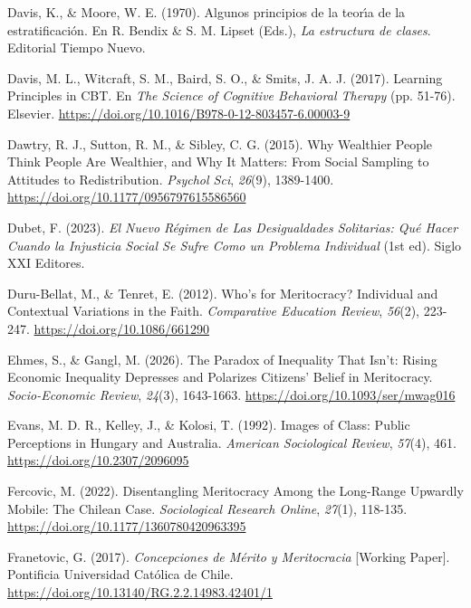 \documentclass[
  spanish,
  a4paper,
  oneside]{scrbook}
\newlength{\cslhangindent}
\newenvironment{CSLReferences}[2] %
 {\begin{list}{}{%
  \setlength{\itemindent}{0pt}
  \setlength{\leftmargin}{0pt}
  \setlength{\parsep}{0pt}
  \ifodd #1
   \setlength{\leftmargin}{\cslhangindent}
   \setlength{\itemindent}{-1\cslhangindent}
  \fi
  \setlength{\itemsep}{#2\baselineskip}}}
 {\end{list}}
\begin{document}
\begin{CSLReferences}{1}{0}
Davis, K., \& Moore, W. E. (1970). {Algunos principios de la teor{ı́}a de
la estratificación}. En R. Bendix \& S. M. Lipset (Eds.), \emph{{La
estructura de clases}}. Editorial Tiempo Nuevo.

Davis, M. L., Witcraft, S. M., Baird, S. O., \& Smits, J. A. J. (2017).
Learning {Principles} in {CBT}. En \emph{The {Science} of {Cognitive
Behavioral Therapy}} (pp. 51-76). Elsevier.
\url{https://doi.org/10.1016/B978-0-12-803457-6.00003-9}

Dawtry, R. J., Sutton, R. M., \& Sibley, C. G. (2015). Why {Wealthier
People Think People Are Wealthier}, and {Why It Matters}: {From Social
Sampling} to {Attitudes} to {Redistribution}. \emph{Psychol Sci},
\emph{26}(9), 1389-1400. \url{https://doi.org/10.1177/0956797615586560}

Dubet, F. (2023). \emph{{El Nuevo Régimen de Las Desigualdades
Solitarias: Qué Hacer Cuando la Injusticia Social Se Sufre Como un
Problema Individual}} (1st ed). Siglo XXI Editores.

Duru-Bellat, M., \& Tenret, E. (2012). Who's for {Meritocracy}?
{Individual} and {Contextual Variations} in the {Faith}.
\emph{Comparative Education Review}, \emph{56}(2), 223-247.
\url{https://doi.org/10.1086/661290}

Ehmes, S., \& Gangl, M. (2026). The Paradox of Inequality That Isn't:
Rising Economic Inequality Depresses and Polarizes Citizens' Belief in
Meritocracy. \emph{Socio-Economic Review}, \emph{24}(3), 1643-1663.
\url{https://doi.org/10.1093/ser/mwag016}

Evans, M. D. R., Kelley, J., \& Kolosi, T. (1992). Images of {Class}:
{Public Perceptions} in {Hungary} and {Australia}. \emph{American
Sociological Review}, \emph{57}(4), 461.
\url{https://doi.org/10.2307/2096095}

Fercovic, M. (2022). Disentangling {Meritocracy Among} the {Long-Range
Upwardly Mobile}: {The Chilean Case}. \emph{Sociological Research
Online}, \emph{27}(1), 118-135.
\url{https://doi.org/10.1177/1360780420963395}

Franetovic, G. (2017). \emph{Concepciones de Mérito y Meritocracia}
{[}Working Paper{]}. Pontificia Universidad Católica de Chile.
\url{https://doi.org/10.13140/RG.2.2.14983.42401/1}


\end{CSLReferences}
\end{document}
